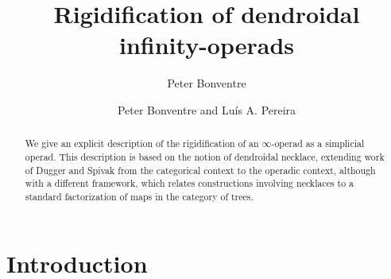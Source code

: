 \documentclass[a4paper,10pt]{article}%
\numberwithin{equation}{section}
\numberwithin{figure}{section}
\theoremstyle{definition} %
\begin{document}
\title{Rigidification of dendroidal infinity-operads}

\author{Peter Bonventre}

\author{Peter Bonventre and Lu\'is A. Pereira}%






\maketitle

\begin{abstract}
	We give an explicit description
	of the rigidification of an $\infty$-operad
	as a simplicial operad.
	This description is based on the notion of 
	dendroidal necklace, 
	extending work of 
	Dugger and Spivak
	from the categorical context to 
	the operadic context,
	although with a different framework,
	which relates constructions involving necklaces 
	to a standard factorization
	of maps in the category of trees.
\end{abstract}


\tableofcontents







\section{Introduction}
\end{document}
